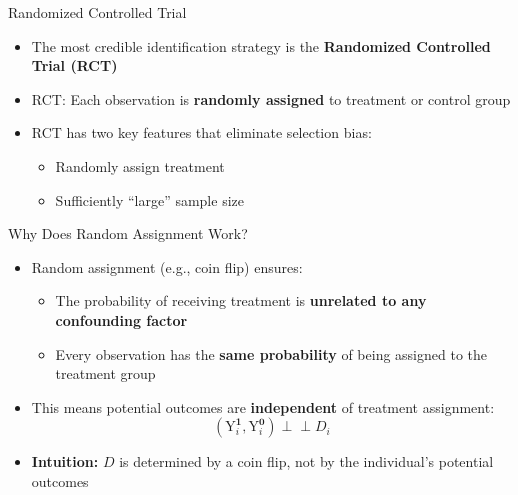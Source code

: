 \documentclass[hyperref={pdfpagelabels=false}]{beamer}
\newcommand{\indep}{\perp\!\!\!\perp}
\begin{document}





\date
{}


\begin{frame}{}
	\titlepage
\end{frame}
	
	
	
	
	

	\begin{frame}{Randomized Controlled Trial}
		\begin{itemize}
			\item The most credible identification strategy is the \textbf{Randomized Controlled Trial (RCT)}
			\vspace{0.3cm}
			\item RCT: Each observation is \textbf{randomly assigned} to treatment or control group
			\vspace{0.3cm}
			\item RCT has two key features that eliminate selection bias:
			\vspace{0.2cm}
			\begin{itemize}
				\item[1] Randomly assign treatment
				\vspace{0.2cm}
				\item[2] Sufficiently ``large'' sample size
			\end{itemize}
		\end{itemize}
	\end{frame}
	
	\begin{frame}{Why Does Random Assignment Work?}
		\begin{itemize}
			\item Random assignment (e.g., coin flip) ensures:
			\vspace{0.2cm}
			\begin{itemize}
				\item The probability of receiving treatment is \textbf{unrelated to any confounding factor}
				\vspace{0.2cm}
				\item Every observation has the \textbf{same probability} of being assigned to the treatment group
			\end{itemize}
			\vspace{0.3cm}
			\item This means potential outcomes are \textbf{independent} of treatment assignment:
			\begin{equation*}
				(\mathrm{Y}^{\mathbf{1}}_{i},\mathrm{Y}^{\mathbf{0}}_{i}) \indep D_{i}
			\end{equation*}
			\item \textbf{Intuition:} $D$ is determined by a coin flip, not by the individual's potential outcomes
		\end{itemize}
	\end{frame}
	
\end{document}
